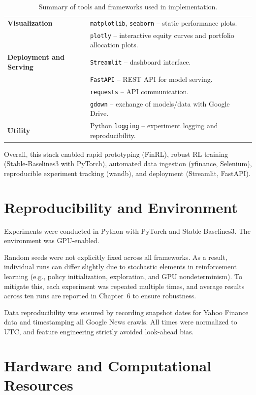 \documentclass[12pt,a4paper]{report}
\begin{document}
\begin{table}[H]
\begin{tabular}{p{4cm} p{10cm}}
\textbf{Visualization} 
 & \texttt{matplotlib}, \texttt{seaborn} -- static performance plots. \\
 & \texttt{plotly} -- interactive equity curves and portfolio allocation plots. \\[0.5em]

\textbf{Deployment and Serving} 
 & \texttt{Streamlit} -- dashboard interface. \\
 & \texttt{FastAPI} -- REST API for model serving. \\
 & \texttt{requests} -- API communication. \\
 & \texttt{gdown} -- exchange of models/data with Google Drive. \\[0.5em]

\textbf{Utility} 
 & Python \texttt{logging} -- experiment logging and reproducibility. \\

\hline
\end{tabular}
\caption{Summary of tools and frameworks used in implementation.}
\label{tab:tools_frameworks}
\end{table}


Overall, this stack enabled rapid prototyping (FinRL), robust RL training (Stable-Baselines3 with PyTorch), automated data ingestion (yfinance, Selenium), reproducible experiment tracking (wandb), and deployment (Streamlit, FastAPI).

\section{Reproducibility and Environment}

Experiments were conducted in Python with PyTorch and Stable-Baselines3. 
The environment was GPU-enabled.  

Random seeds were not explicitly fixed across all frameworks. 
As a result, individual runs can differ slightly due to stochastic elements in reinforcement learning 
(e.g., policy initialization, exploration, and GPU nondeterminism). 
To mitigate this, each experiment was repeated multiple times, and average results across ten runs are reported 
in Chapter~6 to ensure robustness. 

Data reproducibility was ensured by recording snapshot dates for Yahoo Finance data 
and timestamping all Google News crawls. 
All times were normalized to UTC, and feature engineering strictly avoided look-ahead bias.


\section{Hardware and Computational Resources}
\end{document}
